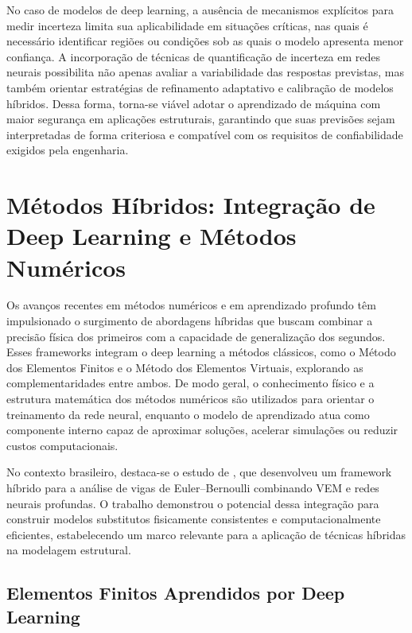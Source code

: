\documentclass[12pt,openright,oneside,a4paper,english,brazil]{abntex2}
\begin{document}
No caso de modelos de deep learning, a ausência de mecanismos explícitos para medir incerteza limita sua aplicabilidade em situações críticas, nas quais é necessário identificar regiões ou condições sob as quais o modelo apresenta menor confiança. A incorporação de técnicas de quantificação de incerteza em redes neurais possibilita não apenas avaliar a variabilidade das respostas previstas, 
mas também orientar estratégias de refinamento adaptativo e calibração de modelos híbridos. Dessa forma, torna-se viável adotar o aprendizado de máquina com maior segurança em aplicações estruturais, garantindo que suas previsões sejam interpretadas de forma criteriosa e compatível com os requisitos de confiabilidade exigidos pela engenharia.

\section{Métodos Híbridos: Integração de Deep Learning e Métodos Numéricos}

Os avanços recentes em métodos numéricos e em aprendizado profundo têm impulsionado o surgimento de abordagens híbridas que buscam combinar a precisão física dos primeiros com a capacidade de generalização dos segundos. Esses frameworks integram o deep learning a métodos clássicos, como o Método dos Elementos Finitos e o Método dos Elementos Virtuais, explorando as 
complementaridades entre ambos. De modo geral, o conhecimento físico e a estrutura matemática dos métodos numéricos são utilizados para orientar o treinamento da rede neural, enquanto o modelo de aprendizado atua como componente interno capaz de aproximar soluções, acelerar simulações ou reduzir custos computacionais.

No contexto brasileiro, destaca-se o estudo de \textcite{provasi2025}, que desenvolveu um framework híbrido para a análise de vigas de Euler–Bernoulli combinando VEM e redes neurais profundas. O trabalho demonstrou o potencial dessa integração para construir modelos substitutos fisicamente consistentes e computacionalmente eficientes, estabelecendo um marco relevante para a 
aplicação de técnicas híbridas na modelagem estrutural.

\subsection{Elementos Finitos Aprendidos por Deep Learning}
\end{document}
